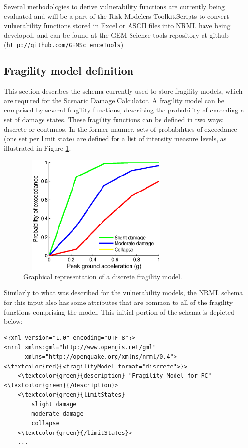 Several methodologies to derive vulnerability functions are currently being evaluated and will be a part of the Risk Modelers Toolkit.Scripts to convert vulnerability functions stored in Excel or ASCII files into NRML have being developed, and can be found at the GEM Science tools repository at github (\textcolor{blue01}{\Verb+http://github.com/GEMScienceTools+})

\subsection{Fragility model definition}
This section describes the schema currently used to store fragility models, which are required for the Scenario Damage Calculator. A fragility model can be comprised by several fragility functions, describing the probability of exceeding a set of damage states. These fragility functions can be defined in two ways: discrete or continuos. In the former manner, sets of probabilities of exceedance (one set per limit state) are defined for a list of intensity measure levels, as illustrated in Figure \ref{fig:fragModelDiscrete}. 

\begin{figure}[ht]
\centering
\includegraphics[width=8cm,height=6cm]{./figures/risk/DisFragilityModel.eps}
\caption{Graphical representation of a discrete fragility model.}
\label{fig:fragModelDiscrete}
\end{figure}

Similarly to what was described for the vulnerability models, the NRML schema for this input also has some attributes that are common to all of the fragility functions comprising the model. This initial portion of the schema is depicted below:

\begin{Verbatim}[frame=single, commandchars=\\\{\}, samepage=true]
<?xml version="1.0" encoding="UTF-8"?>
<nrml xmlns:gml="http://www.opengis.net/gml"
      xmlns="http://openquake.org/xmlns/nrml/0.4">
<\textcolor{red}{<fragilityModel format="discrete">}>
    <\textcolor{green}{description} "Fragility Model for RC" <\textcolor{green}{/description}>
    <\textcolor{green}{limitStates} 
        slight damage
        moderate damage
        collapse     
    <\textcolor{green}{/limitStates}>
    ...
\end{Verbatim}

